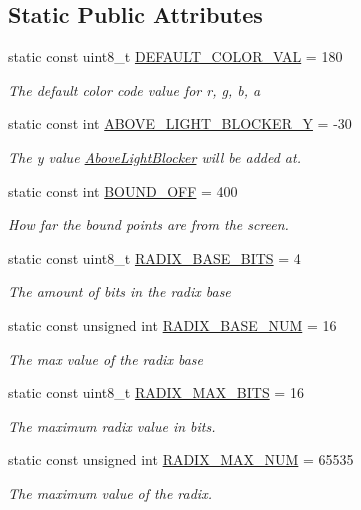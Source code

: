 \subsection*{Static Public Attributes}
\begin{DoxyCompactItemize}
\item 
static const uint8\+\_\+t \hyperlink{classlighting_1_1AboveLightSource_aa3134b6aa1f08719f50290094f014eb2}{D\+E\+F\+A\+U\+L\+T\+\_\+\+C\+O\+L\+O\+R\+\_\+\+V\+AL} = 180
\begin{DoxyCompactList}\small\item\em The default color code value for r, g, b, a \end{DoxyCompactList}\item 
static const int \hyperlink{classlighting_1_1AboveLightSource_aefd3bdb1bb3d0a20657812f75b23f8b2}{A\+B\+O\+V\+E\+\_\+\+L\+I\+G\+H\+T\+\_\+\+B\+L\+O\+C\+K\+E\+R\+\_\+Y} = -\/30
\begin{DoxyCompactList}\small\item\em The y value \hyperlink{classlighting_1_1AboveLightBlocker}{Above\+Light\+Blocker} will be added at. \end{DoxyCompactList}\item 
static const int \hyperlink{classlighting_1_1AboveLightSource_aa87131309853cc76a946de6e004aa778}{B\+O\+U\+N\+D\+\_\+\+O\+FF} = 400
\begin{DoxyCompactList}\small\item\em How far the bound points are from the screen. \end{DoxyCompactList}\item 
static const uint8\+\_\+t \hyperlink{classlighting_1_1AboveLightSource_a698c4d291629788288537b8d9c166132}{R\+A\+D\+I\+X\+\_\+\+B\+A\+S\+E\+\_\+\+B\+I\+TS} = 4
\begin{DoxyCompactList}\small\item\em The amount of bits in the radix base \end{DoxyCompactList}\item 
static const unsigned int \hyperlink{classlighting_1_1AboveLightSource_aa27d69b85b99509a937f3b6cf34e6f5b}{R\+A\+D\+I\+X\+\_\+\+B\+A\+S\+E\+\_\+\+N\+UM} = 16
\begin{DoxyCompactList}\small\item\em The max value of the radix base \end{DoxyCompactList}\item 
static const uint8\+\_\+t \hyperlink{classlighting_1_1AboveLightSource_a4154fa07c5a68055db8c6a710cf0dbec}{R\+A\+D\+I\+X\+\_\+\+M\+A\+X\+\_\+\+B\+I\+TS} = 16
\begin{DoxyCompactList}\small\item\em The maximum radix value in bits. \end{DoxyCompactList}\item 
static const unsigned int \hyperlink{classlighting_1_1AboveLightSource_afb7f4c5e212f5fcc97bcf06a16b21ac3}{R\+A\+D\+I\+X\+\_\+\+M\+A\+X\+\_\+\+N\+UM} = 65535
\begin{DoxyCompactList}\small\item\em The maximum value of the radix. \end{DoxyCompactList}\end{DoxyCompactItemize}
